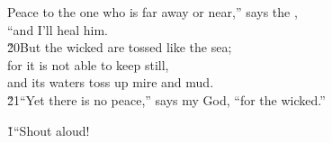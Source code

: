\begin{poetry}
\poemll    Peace to the one who is far away or near,'' says the , \\
\poemlll       ``and I'll heal him. \\
\poeml \v{20}But the wicked are tossed like the sea; \\
\poemll    for it is not able to keep still, \\
\poemlll       and its waters toss up mire and mud. \\
\poeml \v{21}``Yet there is no peace,'' says my God, ``for the wicked.''
\end{poetry}

\v{1}``Shout aloud!

